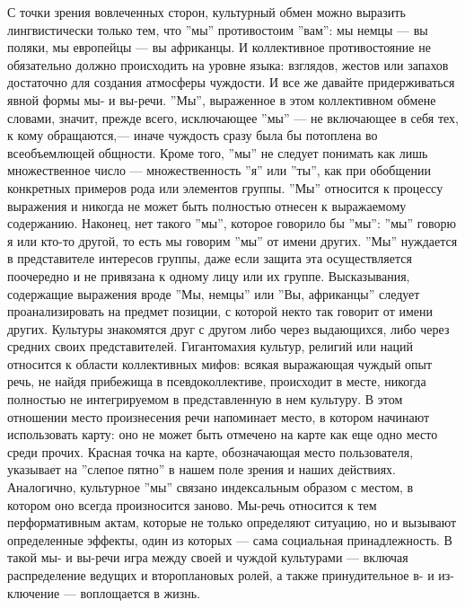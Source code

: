 \documentclass[12pt]{book}
\begin{document}
С точки зрения вовлеченных сторон, культурный обмен можно выразить лингвистически только тем, что ''мы'' противостоим ''вам'': мы немцы --- вы поляки, мы европейцы --- вы африканцы. И коллективное противостояние не обязательно должно происходить на уровне языка: взглядов, жестов или запахов достаточно для создания атмосферы чуждости. И все же давайте придерживаться явной формы мы- и вы-речи. ''Мы'', выраженное в этом коллективном обмене словами, значит, прежде всего, исключающее ''мы'' --- не включающее в себя тех, к кому обращаются,--- иначе чуждость сразу была бы потоплена во всеобъемлющей общности. Кроме того, ''мы'' не следует понимать как лишь множественное число --- множественность ''я'' или ''ты'', как при обобщении конкретных примеров рода или элементов группы. ''Мы'' относится к процессу выражения и никогда не может быть полностью отнесен к выражаемому содержанию. Наконец, нет такого ''мы'', которое говорило бы ''мы'': ''мы'' говорю я или кто-то другой, то есть мы говорим ''мы'' от имени других. ''Мы'' нуждается в представителе интересов группы, даже если защита эта осуществляется поочередно и не привязана к одному лицу или их группе. Высказывания, содержащие выражения вроде ''Мы, немцы'' или ''Вы, африканцы'' следует проанализировать на предмет позиции, с которой некто так говорит от имени других. Культуры знакомятся друг с другом либо через выдающихся, либо через средних своих представителей. Гигантомахия культур, религий или наций относится к области коллективных мифов: всякая выражающая чуждый опыт речь, не найдя прибежища в псевдоколлективе, происходит в месте, никогда полностью не интегрируемом в представленную в нем культуру. В этом отношении место произнесения речи напоминает место, в котором начинают использовать карту: оно не может быть отмечено на карте как еще одно место среди прочих. Красная точка на карте, обозначающая место пользователя, указывает на ''слепое пятно'' в нашем поле зрения и наших действиях. Аналогично, культурное ''мы'' связано индексальным образом с местом, в котором оно всегда произносится заново. Мы-речь относится к тем перформативным актам, которые не только определяют ситуацию, но и вызывают определенные эффекты, один из которых --- сама социальная принадлежность. В такой мы- и вы-речи игра между своей и чуждой культурами --- включая распределение ведущих и второплановых ролей, а также принудительное в- и из-ключение --- воплощается в жизнь.
\end{document}
